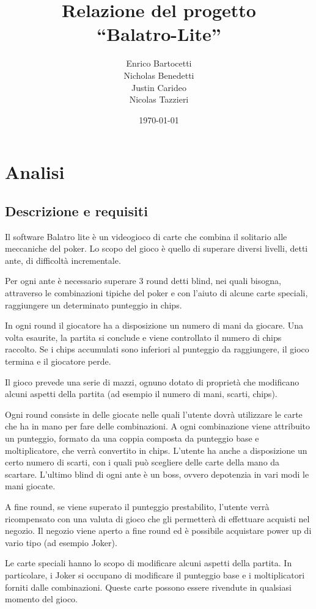 \documentclass[a4paper,12pt]{report}
\title{Relazione del progetto \\``Balatro-Lite''}
\author{
    Enrico Bartocetti\\
    Nicholas Benedetti\\
    Justin Carideo\\
    Nicolas Tazzieri
}
\date{\today}
\begin{document}
\maketitle

\newpage

\tableofcontents

\chapter{Analisi}

\section{Descrizione e requisiti}
Il software Balatro lite è un videogioco di carte che combina il solitario alle meccaniche del poker. Lo scopo del gioco è quello di superare diversi livelli, detti ante, di difficoltà incrementale.

Per ogni ante è necessario superare 3 round detti blind, nei quali bisogna, attraverso le combinazioni tipiche del poker e con l’aiuto di alcune carte speciali, raggiungere un determinato punteggio in chips.

In ogni round il giocatore ha a disposizione un numero di mani da giocare. Una volta esaurite, la partita si conclude e viene controllato il numero di chips raccolto. Se i chips accumulati sono inferiori al punteggio da raggiungere, il gioco termina e il giocatore perde.  

Il gioco prevede una serie di mazzi, ognuno dotato di proprietà che modificano alcuni aspetti della partita (ad esempio il numero di mani, scarti, chips).

Ogni round consiste in delle giocate nelle quali l’utente dovrà utilizzare le carte che ha in mano per fare delle combinazioni. A ogni combinazione viene attribuito un punteggio, formato da una coppia composta da punteggio base e moltiplicatore, che verrà convertito in chips. L’utente ha anche a disposizione un certo numero di scarti, con i quali può scegliere delle carte della mano da scartare.  L'ultimo blind di ogni ante è un boss, ovvero depotenzia in vari modi le mani giocate.

A fine round, se viene superato il punteggio prestabilito, l’utente verrà ricompensato con una valuta di gioco che gli permetterà di effettuare acquisti nel negozio. Il negozio viene aperto a fine round ed è possibile acquistare power up di vario tipo (ad esempio Joker).  

Le carte speciali hanno lo scopo di modificare alcuni aspetti della partita. In particolare, i Joker si occupano di modificare il punteggio base e i moltiplicatori forniti dalle combinazioni. Queste carte possono essere rivendute in qualsiasi momento del gioco.
\end{document}
